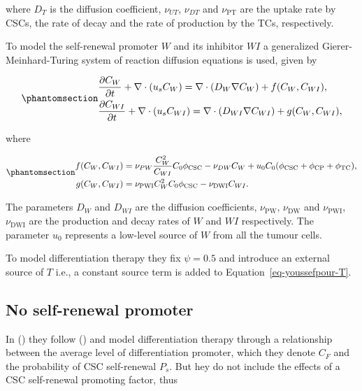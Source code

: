 \documentclass[
  letterpaper,
]{scrreprt}
\theoremstyle{definition}
\theoremstyle{remark}
\begin{document}
where \(D_T\) is the diffusion coefficient, \(\nu_{UT}\), \(\nu_{DT}\)
and \(\nu_\text{PT}\) are the uptake rate by CSCs, the rate of decay and
the rate of production by the TCs, respectively.

To model the self-renewal promoter \(W\) and its inhibitor \(WI\) a
generalized Gierer-Meinhard-Turing system of reaction diffusion
equations is used, given by

\begin{equation}\phantomsection\label{eq-youssefpour-W-WI}{
\begin{aligned}
&\frac{\partial C_W}{\partial t} + \nabla \cdot (u_s C_W) = \nabla \cdot (D_W \nabla C_W) + f(C_W, C_{WI}), \\
&\frac{\partial C_{WI}}{\partial t} + \nabla \cdot (u_s C_{WI}) = \nabla \cdot (D_{WI} \nabla C_{WI}) + g(C_W, C_{WI}),
\end{aligned}
}\end{equation}

where

\begin{equation}\phantomsection\label{eq-youssefpour-f-g}{
\begin{aligned}
f(C_W, C_{WI}) &= \nu_{PW} \frac{C^2_W}{C_{WI}}C_0 \phi_\text{CSC} - \nu_{DW} C_W + u_0C_0 (\phi_\text{CSC} + \phi_\text{CP} + \phi_\text{TC}), \\
g(C_W, C_{WI}) &= \nu_\text{PWI}C^2_W C_0 \phi_\text{CSC} - \nu_\text{DWI} C_{WI}.
\end{aligned}
}\end{equation}

The parameters \(D_W\) and \(D_{WI}\) are the diffusion coefficients,
\(\nu_\text{PW}\), \(\nu_\text{DW}\) and \(\nu_\text{PWI}\),
\(\nu_\text{DWI}\) are the production and decay rates of \(W\) and
\(WI\) respectively. The parameter \(u_0\) represents a low-level source
of \(W\) from all the tumour cells.

To model differentiation therapy they fix \(\psi = 0.5\) and introduce
an external source of \(T\) i.e., a constant source term is added to
Equation~\ref{eq-youssefpour-T}.

\subsection{No self-renewal promoter}\label{no-self-renewal-promoter}

In () they follow
() and model
differentiation therapy through a relationship between the average level
of differentiation promoter, which they denote \(C_F\) and the
probability of CSC self-renewal \(P_s\). But hey do not include the
effects of a CSC self-renewal promoting factor, thus
\end{document}
